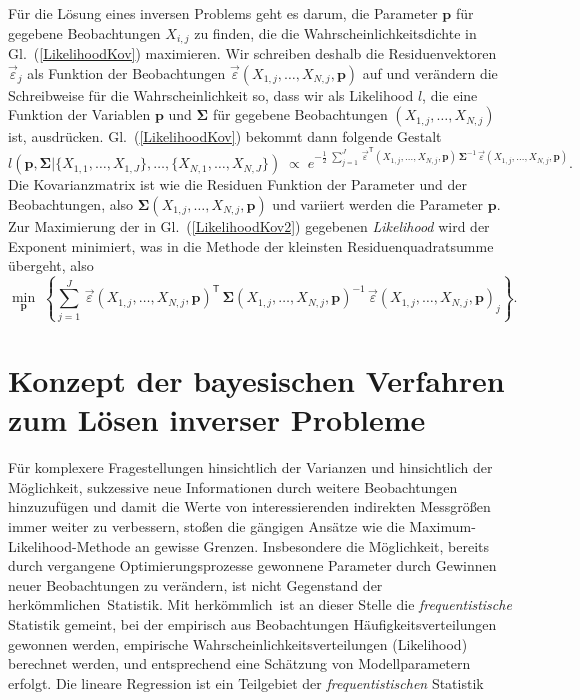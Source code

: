 Für die Lösung eines inversen Problems geht es darum, die Parameter $\mathbf{p}$
für gegebene Beobachtungen $X_{i,j}$ zu finden, die die Wahrscheinlichkeitsdichte
in Gl.~(\ref{LikelihoodKov}) maximieren. Wir schreiben deshalb die Residuenvektoren $\vec \varepsilon_j$ als Funktion
der Beobachtungen $\vec \varepsilon(X_{1,j},\dots,X_{N,j},\mathbf{p})$ auf und verändern die Schreibweise
für die Wahrscheinlichkeit so, dass wir als Likelihood $l$, die eine Funktion der
Variablen $\mathbf{p}$ und $\boldsymbol{\Sigma}$ für gegebene Beobachtungen $(X_{1,j},\dots,X_{N,j})$ ist,
ausdrücken. Gl.~(\ref{LikelihoodKov}) bekommt dann folgende Gestalt
\begin{equation}
l(\mathbf{p}, \boldsymbol{\Sigma} | \{X_{1,1}, \dots, X_{1,J}\}, \dots, \{X_{N,1}, \dots, X_{N,J}\} ) \; \propto \; 
e^{-\frac{1}{2} \; \sum\limits_{j=1}^J \, \vec \varepsilon^\mathsf{T}(X_{1,j},\dots,X_{N,j},\mathbf{p}) \, \boldsymbol{\Sigma}^{-1} \, \vec \varepsilon(X_{1,j},\dots,X_{N,j},\mathbf{p}) } .
\label{LikelihoodKov2}
\end{equation}
Die Kovarianzmatrix ist wie die Residuen Funktion der Parameter und der Beobachtungen,
also $\boldsymbol{\Sigma}(X_{1,j},\dots,X_{N,j},\mathbf{p})$ und
variiert werden die Parameter $\mathbf{p}$.
Zur Maximierung der in Gl.~(\ref{LikelihoodKov2}) gegebenen 
\textsl{Likelihood} wird der Exponent minimiert, was in die Methode der kleinsten Residuenquadratsumme
übergeht, also
\begin{equation}
\min_{\mathbf{p}} \; \left\{ 
 \sum\limits_{j=1}^J \, \vec \varepsilon(X_{1,j},\dots,X_{N,j},\mathbf{p})^\mathsf{T} \, 
\boldsymbol{\Sigma}(X_{1,j},\dots,X_{N,j},\mathbf{p})^{-1} \, \vec \varepsilon(X_{1,j},\dots,X_{N,j},\mathbf{p})_j \right\} .
\label{generalLSmethod}
\end{equation}

\section{Konzept der bayesischen Verfahren zum Lösen inverser Probleme}

Für komplexere Fragestellungen hinsichtlich der Varianzen und hinsichtlich der Möglichkeit,
sukzessive neue Informationen durch weitere Beobachtungen hinzuzufügen und damit die Werte von
interessierenden indirekten Messgrößen immer weiter zu verbessern, stoßen die gängigen Ansätze wie
die Maximum-Likelihood-Methode an gewisse Grenzen. Insbesondere die Möglichkeit, bereits durch
vergangene Optimierungsprozesse gewonnene Parameter durch Gewinnen neuer Beobachtungen zu verändern,
ist nicht Gegenstand der \glqq herkömmlichen\grqq ~Statistik. Mit \glqq herkömmlich\grqq ~ist
an dieser Stelle die \textsl{frequentistische} Statistik gemeint, bei der empirisch aus
Beobachtungen Häufigkeitsverteilungen gewonnen werden, empirische Wahrscheinlichkeitsverteilungen
(Likelihood) berechnet werden, und entsprechend eine Schätzung von Modellparametern erfolgt.
Die lineare Regression ist ein Teilgebiet der \textsl{frequentistischen} Statistik

